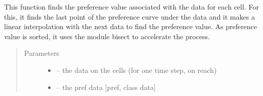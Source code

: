 \documentclass[letterpaper,10pt,english]{sphinxmanual}
\begin{document}

\begin{fulllineitems}
\label{\detokenize{index:src.calcul_hab.find_pref_value}}
This function finds the preference value associated with the data for each cell. For this, it finds the last
point of the preference curve under the data and it makes a linear interpolation with the next data to
find the preference value. As preference value is sorted, it uses the module bisect to accelerate the process.
\begin{quote}\begin{description}
\item[{Parameters}] \leavevmode\begin{itemize}
\item {} 
 -- the data on the cells (for one time step, on reach)

\item {} 
 -- the pref data {[}pref, class data{]}

\end{itemize}

\end{description}\end{quote}

\end{fulllineitems}

\end{document}
